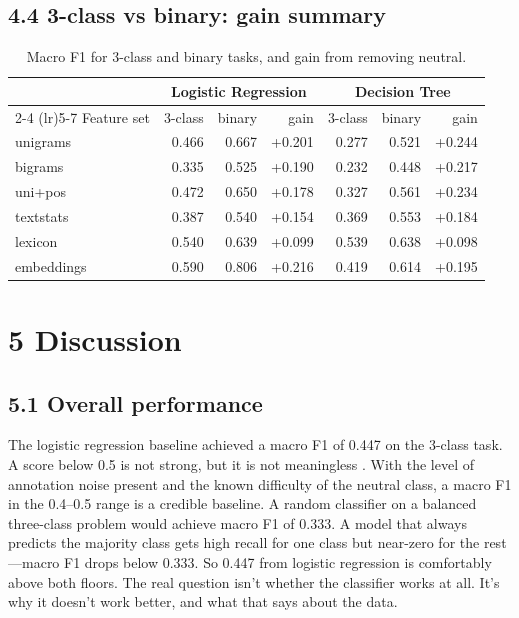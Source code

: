 \documentclass[12pt]{article}
\begin{document}
\subsection*{4.4 3-class vs binary: gain summary}



\begin{table}[h]
\centering
\caption{Macro F1 for 3-class and binary tasks, and gain from removing neutral.}
\label{tab:gain}
\small
\begin{tabular}{lrrr@{\hspace{2em}}rrr}
\toprule
& \multicolumn{3}{c}{Logistic Regression} & \multicolumn{3}{c}{Decision Tree} \\
\cmidrule(lr){2-4} \cmidrule(lr){5-7}
Feature set & 3-class & binary & gain & 3-class & binary & gain \\
\midrule
unigrams   & 0.466 & 0.667 & +0.201 & 0.277 & 0.521 & +0.244 \\
bigrams    & 0.335 & 0.525 & +0.190 & 0.232 & 0.448 & +0.217 \\
uni+pos    & 0.472 & 0.650 & +0.178 & 0.327 & 0.561 & +0.234 \\
textstats  & 0.387 & 0.540 & +0.154 & 0.369 & 0.553 & +0.184 \\
lexicon    & 0.540 & 0.639 & +0.099 & 0.539 & 0.638 & +0.098 \\
embeddings & 0.590 & 0.806 & +0.216 & 0.419 & 0.614 & +0.195 \\
\bottomrule
\end{tabular}
\end{table}



\section*{5 Discussion}



\subsection*{5.1 Overall performance}



The logistic regression baseline achieved a macro F1 of 0.447 on the 3-class task.  
A score below 0.5 is not strong, but it is not meaningless .  
With the level of annotation noise present and the known difficulty of the neutral class, a macro F1 in the 0.4--0.5 range is a credible baseline.
A random classifier on a balanced three-class problem would achieve macro F1 of 0.333. 
A model that always predicts the majority class gets high recall for one class but near-zero for the rest---macro F1 drops below 0.333. So 0.447 from logistic regression is comfortably above both floors. The real question isn't whether the classifier works at all. It's why it doesn't work better, and what that says about the data.
\end{document}
